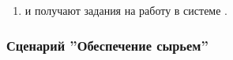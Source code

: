 \begin{enumerate}
\item \gaoperator и \operator получают задания на работу в системе \gofro. %
\end{enumerate}


\subsubsection{Сценарий ''Обеспечение сырьем''}
\label{bp:production_4}


